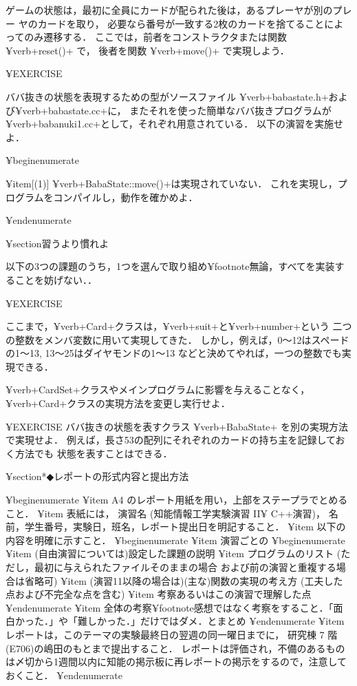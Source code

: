 {{{{{ゲームの状態は，最初に全員にカードが配られた後は，あるプレーヤが別のプレー
ヤのカードを取り，
必要なら番号が一致する2枚のカードを捨てることによってのみ遷移する．
ここでは，前者をコンストラクタまたは関数 ¥verb+reset()+ で，
後者を関数 ¥verb+move()+ で実現しよう．

¥EXERCISE{
ババ抜きの状態を表現するための型がソースファイル
¥verb+babastate.h+および¥verb+babastate.cc+に，
またそれを使った簡単なババ抜きプログラムが
¥verb+babanuki1.cc+として，それぞれ用意されている．
以下の演習を実施せよ．

¥begin{enumerate}

¥item[(1)] ¥verb+BabaState::move()+は実現されていない．
これを実現し，プログラムをコンパイルし，動作を確かめよ．

¥end{enumerate}

}

¥section{習うより慣れよ}

以下の3つの課題のうち，1つを選んで取り組め¥footnote{無論，すべてを実装することを妨げない．}．

¥EXERCISE{
ここまで，¥verb+Card+クラスは，¥verb+suit+と¥verb+number+という
二つの整数をメンバ変数に用いて実現してきた．
しかし，例えば，0〜12はスペードの1〜13, 13〜25はダイヤモンドの1〜13
などと決めてやれば，一つの整数でも実現できる．

¥verb+CardSet+クラスやメインプログラムに影響を与えることなく，
¥verb+Card+クラスの実現方法を変更し実行せよ．
}

¥EXERCISE{
ババ抜きの状態を表すクラス ¥verb+BabaState+ を別の実現方法で実現せよ．
例えば，長さ53の配列にそれぞれのカードの持ち主を記録しておく方法でも
状態を表すことはできる．
}


¥section*{◆レポートの形式内容と提出方法}

¥begin{enumerate}
 ¥item A4 のレポート用紙を用い，上部をステープラでとめること．
 ¥item 表紙には，
演習名 (知能情報工学実験演習 II¥ C++演習)，
名前，学生番号，実験日，班名，レポート提出日を明記すること．
 ¥item 以下の内容を明確に示すこと．
 ¥begin{enumerate}
  ¥item 演習ごとの
  ¥begin{enumerate}
   ¥item (自由演習については)設定した課題の説明
   ¥item プログラムのリスト
(ただし，最初に与えられたファイルそのままの場合
および前の演習と重複する場合は省略可)
   ¥item (演習11以降の場合は)(主な)関数の実現の考え方
(工夫した点および不完全な点を含む)
   ¥item 考察あるいはこの演習で理解した点
  ¥end{enumerate}
  ¥item 全体の考察¥footnote{感想ではなく考察をすること．「面白かった．」や「難しかった．」だけではダメ．}とまとめ
 ¥end{enumerate}
 ¥item レポートは，このテーマの実験最終日の翌週の同一曜日までに，
研究棟 7 階(E706)の嶋田のもとまで提出すること．
レポートは評価され，不備のあるものは〆切から1週間以内に知能の掲示板に再レポートの掲示をするので，注意しておくこと．
¥end{enumerate}

}}}}}
